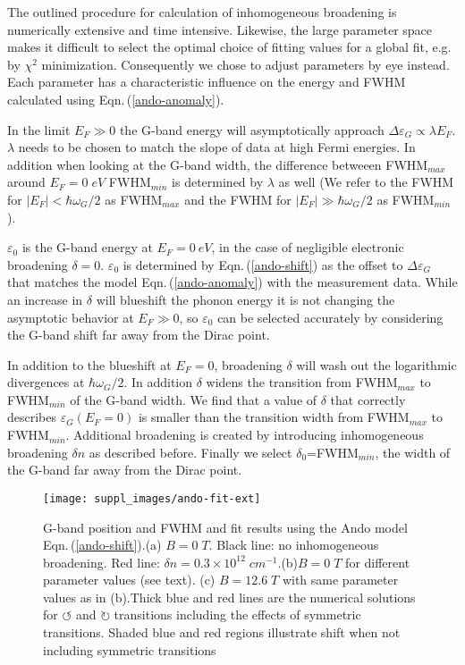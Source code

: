 \documentclass[pra,aps,superscriptaddress,preprint]{revtex4-1}
\begin{document}
The outlined procedure for calculation of inhomogeneous broadening is numerically extensive and time intensive. Likewise, the large parameter space makes it difficult to select the optimal choice of fitting values for a global fit, e.g. by $\chi^2$ minimization. Consequently we chose to adjust parameters by eye instead. Each parameter has a characteristic influence on the energy and FWHM calculated using Eqn.\,(\ref{ando-anomaly}).

\noindent
In the limit $E_F\gg 0$ the G-band energy will asymptotically approach $\Delta \varepsilon_G \propto \lambda E_F$. $\lambda$ needs to be chosen to match the slope of data at high Fermi energies. In addition when looking at the G-band width, the difference betweeen FWHM$_{max}$ around $E_F=0\; eV$ FWHM$_{min}$ is determined by $\lambda$ as well (We refer to the FWHM for $|E_F|<\hbar\omega_G /2$ as FWHM$_{max}$ and the FWHM for $|E_F|\gg \hbar\omega_G /2$ as FWHM$_{min}$).

\noindent
$\varepsilon_0$ is the G-band energy at $E_F=0\: eV$, in the case of negligible electronic broadening $\delta = 0$. $\varepsilon_0$ is determined by Eqn.\,(\ref{ando-shift}) as the offset to $\Delta \varepsilon_G$ that matches the model Eqn.\,(\ref{ando-anomaly}) with the measurement data. While an increase in $\delta$ will blueshift the phonon energy it is not changing the asymptotic behavior at $E_F\gg 0$, so $\varepsilon_0$ can be selected accurately by considering the G-band shift far away from the Dirac point.

In addition to the blueshift at $E_F = 0$, broadening $\delta$ will wash out the logarithmic divergences at $\hbar\omega_G /2$. In addition $\delta$ widens the transition from FWHM$_{max}$ to FWHM$_{min}$ of the G-band width.
We find that a value of $\delta$ that correctly describes $\varepsilon_G(E_F=0)$ is smaller than the transition width from FWHM$_{max}$ to FWHM$_{min}$. Additional broadening is created by introducing inhomogeneous broadening $\delta n$ as described before. 
Finally we select $\delta_0$=FWHM$_{min}$, the width of the G-band far away from the Dirac point.

\begin{figure}[!ht]
   \texttt{[image: suppl\_images/ando-fit-ext]}
   \caption{\label{ando-fit-ext}G-band position and FWHM and fit results using the Ando model Eqn.\,(\ref{ando-shift}).(a) $B=0\; T$. Black line: no inhomogeneous broadening. Red line: $\delta n = 0.3\times 10^{12}\; cm^{-1}$.(b)$B=0\; T$ for different parameter values (see text). (c) $B=12.6\; T$ with same parameter values as in (b).Thick blue and red lines are the numerical solutions for $\circlearrowleft$ and $\circlearrowright$ transitions including the effects of symmetric transitions. Shaded blue and red regions illustrate shift when not including symmetric transitions}
\end{figure}
\end{document}
